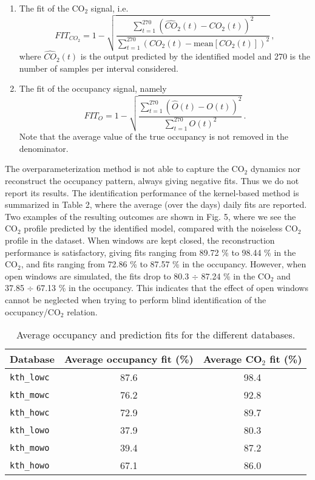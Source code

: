 \documentclass{article}
\begin{document}
\begin{enumerate}
\item The fit of the CO$_2$ signal, i.e.
\begin{equation}
  FIT_{CO_2} = 1 - \sqrt{\frac{\sum_{t=1}^{270} {(\widehat{CO}_2(t) -
  CO_2(t))}^2}{\sum_{t=1}^{270} {(CO_2(t) -  \mathrm{mean}[CO_2(t)])}^2}} \,,
\end{equation}
where $\widehat{CO}_2(t)$ is the output predicted by the identified model and 270 is the number of samples per interval considered.
\item The fit of the occupancy signal, namely
\begin{equation}
  FIT_{O} = 1 - \sqrt{\frac{\sum_{t=1}^{270} {(\widehat{O}(t) -
  O(t))}^2}{\sum_{t=1}^{270} {O(t)}^2}} \,.
\end{equation}
Note that the average value of the true occupancy is not removed in the denominator.
\end{enumerate}
The overparameterization method is not able to capture the CO$_2$ dynamics nor reconstruct the occupancy pattern, always giving negative fits. Thus we do not report its results.
The identification performance of the kernel-based method is summarized in
Table 2, where the average (over the days) daily fits are reported. Two
examples of the resulting outcomes are shown in Fig. 5, where we see the
CO$_2$ profile predicted by the identified model, compared with the noiseless
CO$_2$ profile in the dataset.
When windows are kept closed, the reconstruction performance is satisfactory, giving fits ranging from 89.72 \% to 98.44 \% in the CO$_2$, and fits ranging from 72.86 \% to 87.57 \% in the occupancy. However, when open windows are simulated, the fits drop to 80.3  $\div$ 87.24 \% in the CO$_2$ and 37.85  $\div$ 67.13 \% in the occupancy. This indicates that the effect of open windows cannot be neglected when trying to perform blind identification of the occupancy/CO$_2$ relation.
\begin{table}[h!]\label{tab:fits}
\begin{center}
\begin{tabular}{lcc}
  \toprule
Database & Average occupancy fit (\%)& Average CO$_2$ fit (\%) \\
\midrule
\texttt{kth\_lowc} & 87.6 & 98.4 \\
\texttt{kth\_mowc} & 76.2 & 92.8 \\
\texttt{kth\_howc} & 72.9 & 89.7 \\
\texttt{kth\_lowo} & 37.9 & 80.3 \\
\texttt{kth\_mowo} & 39.4 & 87.2 \\
\texttt{kth\_howo} & 67.1 & 86.0 \\
\bottomrule
\end{tabular}
\vspace{2mm}
\caption{Average occupancy and prediction fits for the different databases.}
\end{center}
\end{table}
\end{document}
